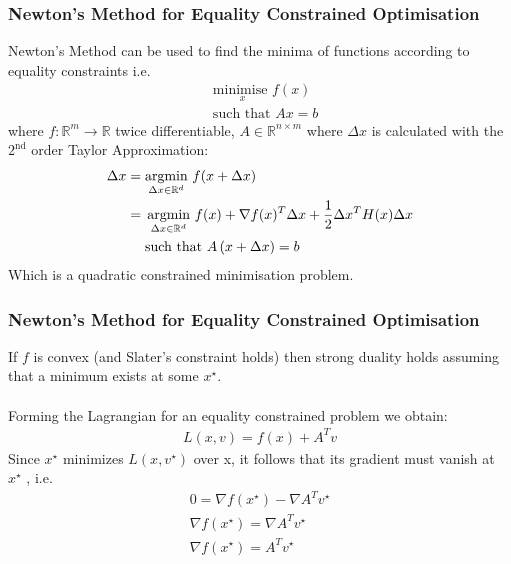 \documentclass{beamer}
\def\rnum{\mathbb{R}}
\begin{document}
\begin{frame}
    \frametitle{Newton's Method for Equality Constrained Optimisation}
    Newton's Method can be used to find the minima of functions according to
    equality constraints i.e.
    \begin{align*}
        &\underset{x}{\text{minimise }}  f(x) \\
        &\text{such that } A x = b
    \end{align*}
    where $f : \rnum^{m} \rightarrow \rnum$ twice differentiable, $A \in \rnum^{n \times m} $
    where $\Delta x$ is calculated with the $2^{\text{nd}}$ order Taylor Approximation:
    {\footnotesize
    \begin{align*}
        \Delta x &= \underset{\Delta x \in \rnum^{d}}{\text{argmin}}\, \,f(x + \Delta
        x)  \\
        &= \, \underset{\Delta x \in \rnum^{d}}{\text{argmin}} \, \, f(x) + \nabla f(x)^{T}
        \Delta x + \frac{1}{2}\Delta x^{T}H(x)\Delta x \\ \vspace{1mm}
        &\,\,\,\,\,\, \text{             such that } A\, (x + \Delta x) = b
    \end{align*}}
    Which is a quadratic constrained minimisation problem.
\end{frame}

\begin{frame}
    \frametitle{Newton's Method for Equality Constrained Optimisation}
    If $f$ is convex (and Slater's constraint holds) then strong duality holds
    assuming that a minimum exists at some $x^{\star}$.
    \\~\\
    Forming the Lagrangian for an equality constrained problem we
    obtain:
    \begin{align*}
        L(x, v) = f(x) + A^{T}v
    \end{align*}
    Since $x^{\star}$ minimizes $L(x, v^{\star} )$ over x, it follows that
    its gradient must vanish at $x^{\star}$ , i.e.
    \begin{align*}
        0 = \nabla f(x^{\star}) -  \nabla A^{T}v^{\star} \\
        \nabla f(x^{\star}) = \nabla A^{T}v^{\star} \\
        \nabla f(x^{\star}) = A^{T} v^{\star}
    \end{align*}
\end{frame}
\end{document}

